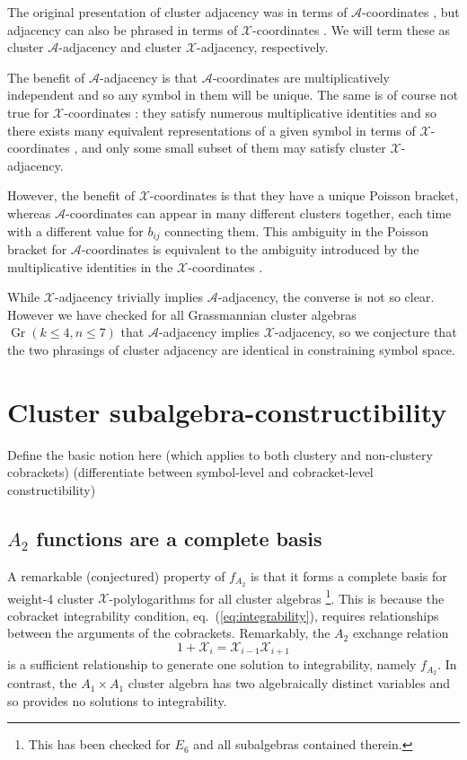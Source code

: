 \documentclass[11pt]{article}
\DeclareMathOperator{\Gr}{Gr}
\def\x{\mathcal{X}}
\def\xcoords{$\mathcal{X}$-coordinates }
\def\a{\mathcal{A}}
\def\acoords{$\mathcal{A}$-coordinates }
\def\flag{{\huge \color{red} \textinterrobang}}
\def\pdfeq#1{\texorpdfstring{$#1$}{a}}
\begin{document}
The original presentation of cluster adjacency was in terms of \acoords, but adjacency can also be phrased in terms of \xcoords. We will term these as cluster $\a$-adjacency and cluster $\x$-adjacency, respectively. 

The benefit of $\a$-adjacency is that \acoords are multiplicatively independent and so any symbol in them will be unique. The same is of course not true for \xcoords: they satisfy numerous multiplicative identities and so there exists many equivalent representations of a given symbol in terms of \xcoords, and only some small subset of them may satisfy cluster $\x$- adjacency. 

However, the benefit of \xcoords is that they have a unique Poisson bracket, whereas \acoords can appear in many different clusters together, each time with a different value for $b_{ij}$ connecting them. This ambiguity in the Poisson bracket for \acoords is equivalent to the ambiguity introduced by the multiplicative identities in the \xcoords.  

While $\x$-adjacency trivially implies $\a$-adjacency, the converse is not so clear. However we have checked for all Grassmannian cluster algebras $\Gr(k\le4,n\le7)$ that $\a$-adjacency implies $\x$-adjacency, so we conjecture that the two phrasings of cluster adjacency are identical in constraining symbol space. \flag

\section{Cluster subalgebra-constructibility}\label{sec:sub-constructibility} 

Define the basic notion here (which applies to both clustery and non-clustery cobrackets) (differentiate between symbol-level and cobracket-level constructibility)

\subsection{\pdfeq{A_2} functions are a complete basis}

A remarkable (conjectured) property of $f_{A_2}$ is that it forms a complete basis for weight-4 cluster $\x$-polylogarithms for all cluster algebras \footnote{This has been checked for $E_6$ and all subalgebras contained therein.}. This is because the cobracket integrability condition, eq.~(\ref{eq:integrability}), requires relationships between the arguments of the cobrackets. Remarkably, the $A_2$ exchange relation
\begin{equation}
	1+\x_i = \x_{i-1}\x_{i+1}
\end{equation}
is a sufficient relationship to generate one solution to integrability, namely $f_{A_2}$. In contrast, the $A_1\times A_1$ cluster algebra has two algebraically distinct variables and so provides no solutions to integrability. 
\end{document}
